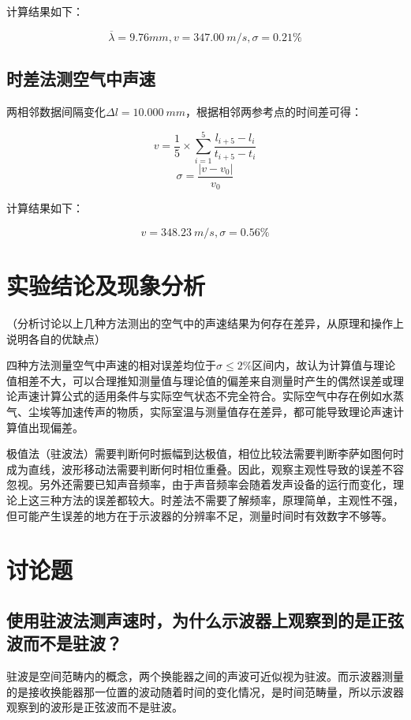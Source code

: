 \documentclass{ctexart}
\begin{document}
计算结果如下：

$$ \overline{\lambda} = 9.76 mm , v = 347.00 \ m/s,\sigma = 0.21\% $$

\subsection{时差法测空气中声速}

两相邻数据间隔变化$\Delta l = 10.000\ mm$，根据相邻两参考点的时间差可得：

$$ v = \frac{1}{5} \times \sum_{i = 1}^{5} \frac{l_{i+5} - l_i}{t_{i+5} - t_i} $$
$$ \sigma = \frac{|v - v_0|}{v_0} $$

计算结果如下：

$$ v = 348.23 \ m/s,\sigma = 0.56\% $$

\section{实验结论及现象分析}

（分析讨论以上几种方法测出的空气中的声速结果为何存在差异，从原理和操作上说明各自的优缺点）

四种方法测量空气中声速的相对误差均位于$\sigma \leq 2\%$区间内，故认为计算值与理论值相差不大，可以合理推知测量值与理论值的偏差来自测量时产生的偶然误差或理论声速计算公式的适用条件与实际空气状态不完全符合。实际空气中存在例如水蒸气、尘埃等加速传声的物质，实际室温与测量值存在差异，都可能导致理论声速计算值出现偏差。 

极值法（驻波法）需要判断何时振幅到达极值，相位比较法需要判断李萨如图何时成为直线，波形移动法需要判断何时相位重叠。因此，观察主观性导致的误差不容忽视。另外还需要已知声音频率，由于声音频率会随着发声设备的运行而变化，理论上这三种方法的误差都较大。时差法不需要了解频率，原理简单，主观性不强，但可能产生误差的地方在于示波器的分辨率不足，测量时间时有效数字不够等。

\section{讨论题}

\subsection{使用驻波法测声速时，为什么示波器上观察到的是正弦波而不是驻波？}

驻波是空间范畴内的概念，两个换能器之间的声波可近似视为驻波。而示波器测量的是接收换能器那一位置的波动随着时间的变化情况，是时间范畴量，所以示波器观察到的波形是正弦波而不是驻波。
\end{document}
